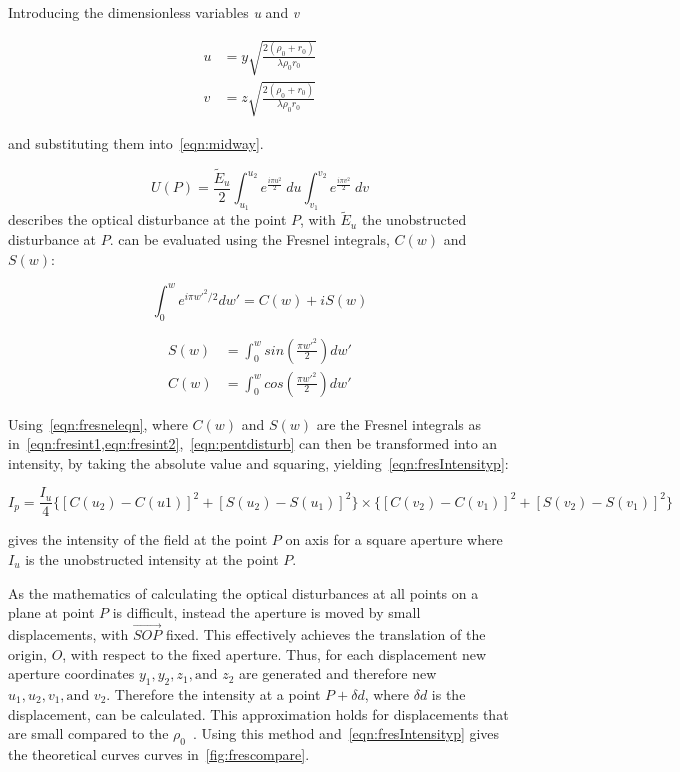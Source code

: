 Introducing the dimensionless variables \textit{u} and \textit{v}

\begin{align}
u&=y\sqrt{\frac{2(\rho_0+r_0)}{\lambda\rho_0r_0}}\\
v&=z\sqrt{\frac{2(\rho_0+r_0)}{\lambda\rho_0r_0}}
\end{align}

and substituting them into~\cref{eqn:midway}.

\begin{equation}
U(P)=\frac{\tilde{E}_u}{2}\int_{u_1}^{u_2} e^{\tfrac{i\pi u^2}{2}}\ du\int_{v_1}^{v_2} e^{\tfrac{i\pi v^2}{2}} \ dv
\label{eqn:pentdisturb}
\end{equation}
 describes the optical disturbance at the point $P$, with $\tilde{E}_u$ the unobstructed disturbance at $P$.
 can be evaluated using the Fresnel integrals, $C(w)$ and $S(w)$:


\begin{equation}
\int_{0}^{w}e^{i\pi w'^2/2}dw'=C(w)+iS(w)
\label{eqn:fresneleqn}
\end{equation}


\begin{align}
S(w)&=\int^w_0 sin\left(\frac{\pi w'^2}{2}\right)dw'\label{eqn:fresint1}\\
C(w)&=\int^w_0 cos\left(\frac{\pi w'^2}{2}\right)dw'\label{eqn:fresint2}
\end{align}


Using~\cref{eqn:fresneleqn}, where $C(w)$ and $S(w)$ are the Fresnel integrals as in~\cref{eqn:fresint1,eqn:fresint2},~\cref{eqn:pentdisturb} can then be transformed into an intensity, by taking the absolute value and squaring, yielding~\cref{eqn:fresIntensityp}:


\begin{equation}
I_p = \frac{I_u}{4} \{[C(u_2) - C(u1)]^2 + [S(u_2) - S(u_1)]^2\} \times \{[C(v_2) - C(v_1)]^2 + [S(v_2) - S(v_1)]^2\}
\label{eqn:fresIntensityp}
\end{equation}

 gives the intensity of the field at the point $P$ on axis for a square aperture where $I_u$ is the unobstructed intensity at the point $P$. 

\medskip

As the mathematics of calculating the optical disturbances at all points on a plane at point $P$ is difficult, instead the aperture is moved by small displacements, with $\overrightarrow{SOP}$ fixed.
This effectively achieves the translation of the origin, $O$, with respect to the fixed aperture. 
Thus, for each displacement new aperture coordinates $y_1, y_2, z_1, \text{and } z_2$ are generated and therefore new $u_1, u_2, v_1, \text{and }v_2$.
Therefore the intensity at a point $P +\delta d$, where $\delta d$ is the displacement, can be calculated.
This approximation holds for displacements that are small compared to the $\rho_0$~\cite{born2000principles,hecht2017optics,goodman2017introduction}.
Using this method and~\cref{eqn:fresIntensityp} gives the theoretical curves curves in~\cref{fig:frescompare}.

